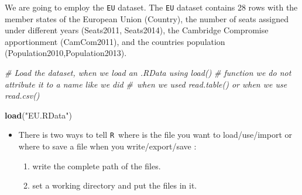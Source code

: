 \documentclass[]{book}
\newenvironment{Shaded}{\begin{snugshade}}{\end{snugshade}}
\newcommand{\KeywordTok}[1]{\textcolor[rgb]{0.13,0.29,0.53}{\textbf{{#1}}}}
\newcommand{\StringTok}[1]{\textcolor[rgb]{0.31,0.60,0.02}{{#1}}}
\newcommand{\CommentTok}[1]{\textcolor[rgb]{0.56,0.35,0.01}{\textit{{#1}}}}
\newcommand{\NormalTok}[1]{{#1}}
\providecommand{\tightlist}{%
  \setlength{\itemsep}{0pt}\setlength{\parskip}{0pt}}
\newenvironment{rmdblock}[1]
  {\begin{shaded*}
  \begin{itemize}
  \renewcommand{\labelitemi}{
    \raisebox{-.7\height}[0pt][0pt]{
      {\setkeys{Gin}{width=2em,keepaspectratio}\texttt{[image: img/icons/\#1]}}
    }
  }
  \item
  }
  {
  \end{itemize}
  \end{shaded*}
  }
\newenvironment{rmdinsight}
  {\begin{rmdblock}{insight}}
  {\end{rmdblock}}
\begin{document}
We are going to employ the \texttt{EU} dataset. The \texttt{EU} dataset
contains 28 rows with the member states of the European Union (Country),
the number of seats assigned under different years (Seats2011,
Seats2014), the Cambridge Compromise apportionment (CamCom2011), and the
countries population (Population2010,Population2013).

\begin{Shaded}
\begin{Highlighting}[]
\CommentTok{# Load the dataset, when we load an .RData using load()}
\CommentTok{# function we do not attribute it to a name like we did}
\CommentTok{# when we used read.table() or when we use read.csv()}

\KeywordTok{load}\NormalTok{(}\StringTok{"EU.RData"}\NormalTok{)}
\end{Highlighting}
\end{Shaded}

\begin{rmdinsight}
There is two ways to tell \texttt{R}~where is the file you want to
load/use/import or where to save a file when you write/export/save :

\begin{enumerate}
\def\labelenumi{\arabic{enumi}.}
\tightlist
\item
  write the complete path of the files.
\item
  set a working directory and put the files in it.
\end{enumerate}
\end{rmdinsight}
\end{document}
